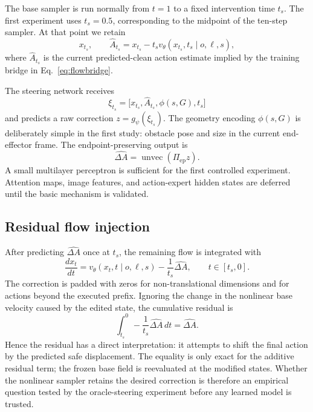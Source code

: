 \documentclass[10pt,conference]{IEEEtran}
\newcommand{\1}{\mathbf{1}}
\begin{document}
The base sampler is run normally from $t=1$ to a fixed intervention time $t_s$. The first experiment uses $t_s=0.5$, corresponding to the midpoint of the ten-step sampler. At that point we retain
\begin{equation}
    x_{t_s},
    \qquad
    \widehat A_{t_s}=x_{t_s}-t_s v_\theta(x_{t_s},t_s\mid o,\ell,s),
    \label{eq:predclean}
\end{equation}
where $\widehat A_{t_s}$ is the current predicted-clean action estimate implied by the training bridge in Eq.~\eqref{eq:flowbridge}.

The steering network receives
\begin{equation}
    \xi_{t_s}=\big[x_{t_s},\widehat A_{t_s},\phi(s,G),t_s\big]
\end{equation}
and predicts a raw correction $z=g_\psi(\xi_{t_s})$. The geometry encoding $\phi(s,G)$ is deliberately simple in the first study: obstacle pose and size in the current end-effector frame. The endpoint-preserving output is
\begin{equation}
    \widehat{\Delta A}=\operatorname{unvec}(\Pi_{\mathrm{ep}}z).
    \label{eq:predcorr}
\end{equation}
A small multilayer perceptron is sufficient for the first controlled experiment. Attention maps, image features, and action-expert hidden states are deferred until the basic mechanism is validated.

\subsection{Residual flow injection}

After predicting $\widehat{\Delta A}$ once at $t_s$, the remaining flow is integrated with
\begin{equation}
    \frac{dx_t}{dt}
    =v_\theta(x_t,t\mid o,\ell,s)
    -\frac{1}{t_s}\widehat{\Delta A},
    \qquad t\in[t_s,0].
    \label{eq:guidedflow}
\end{equation}
The correction is padded with zeros for non-translational dimensions and for actions beyond the executed prefix. Ignoring the change in the nonlinear base velocity caused by the edited state, the cumulative residual is
\begin{equation}
    \int_{t_s}^{0}-\frac{1}{t_s}\widehat{\Delta A}\,dt
    =\widehat{\Delta A}.
    \label{eq:integral}
\end{equation}
Hence the residual has a direct interpretation: it attempts to shift the final action by the predicted safe displacement. The equality is only exact for the additive residual term; the frozen base field is reevaluated at the modified states. Whether the nonlinear sampler retains the desired correction is therefore an empirical question tested by the oracle-steering experiment before any learned model is trusted.
\end{document}
